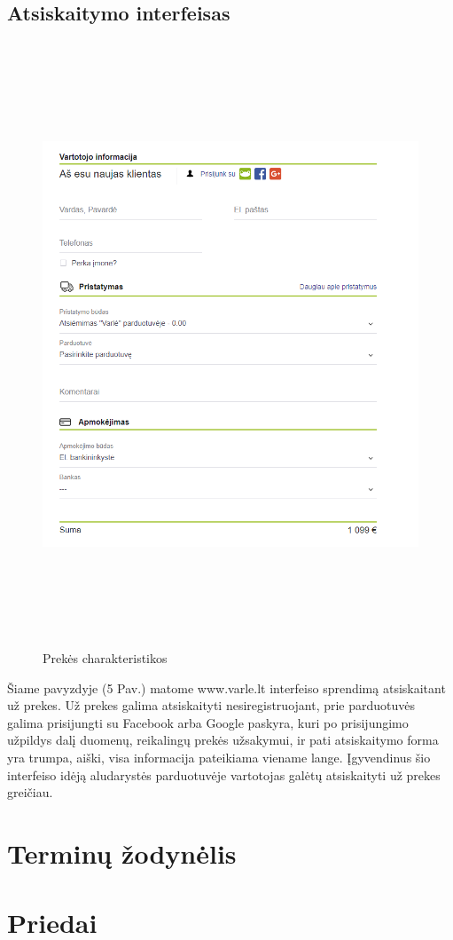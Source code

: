 \documentclass[oneside]{VUMIFPSkursinis}
\begin{document}
	\subsection{Atsiskaitymo interfeisas}
		\begin{figure}[h]
			\centering
			\includegraphics[width=12cm,height=18cm,keepaspectratio]{IkvepiantisInterfeisas5.png}
			\caption{ Prekės charakteristikos}
		\end{figure}

		Šiame pavyzdyje (5 Pav.) matome www.varle.lt interfeiso sprendimą atsiskaitant už prekes.
		Už prekes galima atsiskaityti nesiregistruojant, prie parduotuvės galima prisijungti su Facebook arba Google paskyra, kuri po prisijungimo užpildys dalį duomenų, reikalingų prekės užsakymui, ir pati atsiskaitymo forma yra trumpa, aiški, visa informacija pateikiama viename lange.
		Įgyvendinus šio interfeiso idėją aludarystės parduotuvėje vartotojas galėtų atsiskaityti už prekes greičiau.

\section{Terminų žodynėlis}
\section{Priedai}
\end{document}
